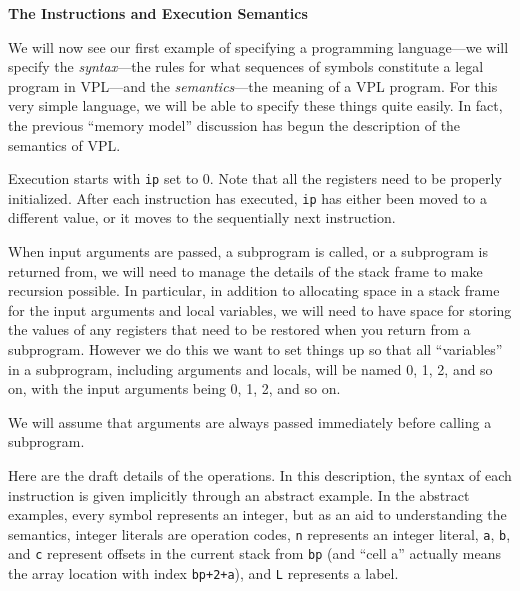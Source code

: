 \bigskip

{\bf The Instructions and Execution Semantics}
\medskip

We will now see our first example of specifying a programming language---we will
specify the {\it syntax}---the rules for what sequences of symbols constitute a legal
program in VPL---and the {\it semantics}---the meaning of a VPL program.
For this very simple language, we will be able to specify these things quite easily.
In fact, the previous ``memory model'' discussion has begun the description of the
semantics of VPL.
\bigskip

Execution starts with {\tt ip} set to 0.  Note that all the registers
need to be properly initialized.
After each instruction has executed, {\tt ip} has either been moved
to a different value, or it moves to the sequentially next instruction.
\medskip

When input arguments are passed, a subprogram is called,
or a subprogram is returned from, we will need to manage the
details of the stack frame to make recursion possible.
In particular, in addition to allocating space in a stack frame
for the input arguments and local variables, we will need to have
space for storing the values of any registers that need to be
restored when you return from a subprogram.  However we do this
we want to set things up so that all ``variables'' in a subprogram,
including arguments and locals, will be named 0, 1, 2, and so on, with
the input arguments being 0, 1, 2, and so on.
\medskip

We will assume that arguments are always passed immediately before
calling a subprogram.
\medskip

Here are the draft details of the operations.
In this description, the syntax of each instruction is given
implicitly through an abstract example.  In the abstract
examples, every symbol represents an integer,
but as an aid to understanding the semantics,
integer literals are operation codes, {\tt n} represents
an integer literal,
{\tt a}, {\tt b}, and {\tt c} represent offsets in the current
stack from {\tt bp} (and ``cell a'' actually means the
array location with index {\tt bp+2+a}),
and
{\tt L} represents a label.
\medskip

